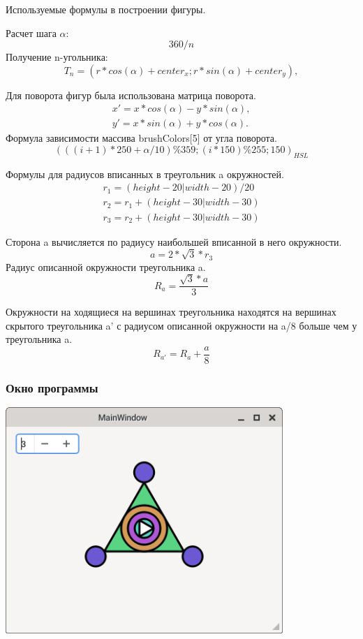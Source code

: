 Используемые формулы в построении фигуры.

Расчет шага \(\alpha\): \[360/n\] Получение n-угольника:
\[T_n = (r*cos(\alpha)+center_x;r*sin(\alpha)+center_y),\]

Для поворота фигур была использована матрица поворота.
\[ \begin{array}{ccc}
x' = x*cos(\alpha)-y*sin(\alpha),
\\
y' = x*sin(\alpha)+y*cos(\alpha).
\end{array}
\] Формула зависимости массива brushColors{[}5{]} от угла поворота.
\[(((i+1)*250+\alpha/10)\%359;(i*150)\%255;150)_{HSL}\]

Формулы для радиусов вписанных в треугольник a окружностей. \[
    \begin{array}{ccc}
    r_1 = (height-20|width-20)/20
    \\
    r_2 = r_1+(height-30|width-30)
    \\
    r_3 = r_2+(height-30|width-30)
    \end{array}
\]

Сторона a вычисляется по радиусу наибольшей вписанной в него окружности.
\[a = 2*\sqrt{3}*r_3\] Радиус описанной окружности треугольника a.
\[R_a = \frac{\sqrt{3}*a}{3}\]

Окружности на ходящиеся на вершинах треугольника находятся на вершинах
скрытого треугольника a' с радиусом описанной окружности на a/8 больше
чем у треугольника a. \[R_{a'} = R_a+\frac{a}{8} \]

\hypertarget{ux43eux43aux43dux43e-ux43fux440ux43eux433ux440ux430ux43cux43cux44b}{%
\subsubsection{Окно
программы}\label{ux43eux43aux43dux43e-ux43fux440ux43eux433ux440ux430ux43cux43cux44b}}

\includegraphics{./files/pic2.png}
